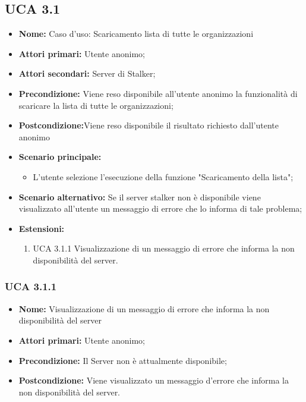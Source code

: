 \subsection{UCA 3.1}%
\begin{itemize}
\item \textbf{Nome:} Caso d’uso: Scaricamento lista di tutte le organizzazioni
\item \textbf{Attori primari:} Utente anonimo;
\item \textbf{Attori secondari: } Server di Stalker;
\item \textbf{Precondizione:} Viene reso disponibile all’utente anonimo la funzionalità di scaricare la lista di tutte le organizzazioni;
\item \textbf{Postcondizione:}Viene reso disponibile il risultato richiesto dall’utente anonimo
\item \textbf{Scenario principale:} 
\begin{itemize}
	\item L'utente selezione l'esecuzione della funzione "Scaricamento della lista";
\end{itemize}
\item \textbf{Scenario alternativo:}  Se il server stalker non è disponibile viene visualizzato all’utente un messaggio di errore che lo informa di tale problema;
\item \textbf{Estensioni:}
	\begin{enumerate}
	\item UCA 3.1.1 Visualizzazione di un messaggio di errore che informa la non disponibilità del server.
\end{enumerate}
  
\end{itemize}

\subsubsection{UCA 3.1.1}%
\begin{itemize}
\item \textbf{Nome:} Visualizzazione di un messaggio di errore che informa la non disponibilità del server
\item \textbf{Attori primari:} Utente anonimo;
\item \textbf{Precondizione:} Il Server non è attualmente disponibile;
\item \textbf{Postcondizione:} Viene visualizzato un messaggio d’errore che informa la non disponibilità del server.

\end{itemize}

